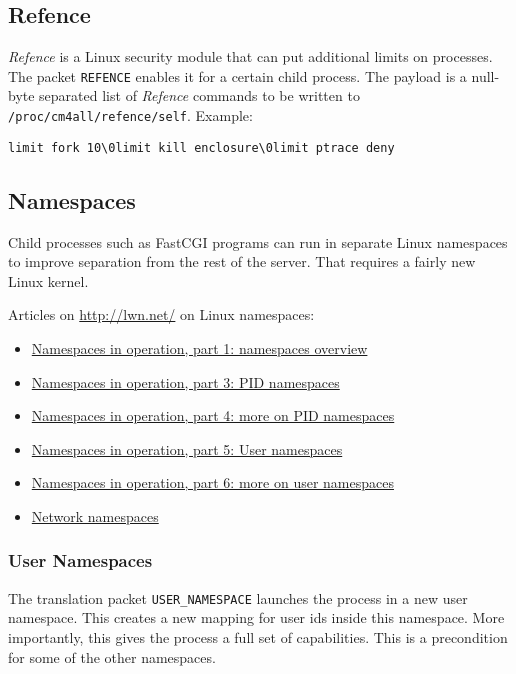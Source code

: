 \documentclass[a4paper,12pt]{article}
\begin{document}
\subsection{Refence}
\label{refence}

\emph{Refence} is a Linux security module that can put additional
limits on processes.  The packet \verb|REFENCE| enables it for a
certain child process.  The payload is a null-byte separated list of
\emph{Refence} commands to be written to
\texttt{/proc/cm4all/refence/self}.  Example:

\begin{verbatim}
limit fork 10\0limit kill enclosure\0limit ptrace deny
\end{verbatim}


\subsection{Namespaces}
\label{ns}

Child processes such as FastCGI programs can run in separate Linux
namespaces to improve separation from the rest of the server.  That
requires a fairly new Linux kernel.

Articles on \url{http://lwn.net/} on Linux namespaces:

\begin{itemize}
\item \href{https://lwn.net/Articles/531114/}{Namespaces in operation,
  part 1: namespaces overview}
\item \href{http://lwn.net/Articles/531419/}{Namespaces in operation,
  part 3: PID namespaces}
\item \href{http://lwn.net/Articles/532748/}{Namespaces in operation,
  part 4: more on PID namespaces}
\item \href{http://lwn.net/Articles/532593/}{Namespaces in operation,
  part 5: User namespaces}
\item \href{https://lwn.net/Articles/540087/}{Namespaces in operation,
  part 6: more on user namespaces}
\item \href{http://lwn.net/Articles/219794/}{Network namespaces}
\end{itemize}

\subsubsection{User Namespaces}

The translation packet \verb|USER_NAMESPACE| launches the process in a
new user namespace.  This creates a new mapping for user ids inside
this namespace.  More importantly, this gives the process a full set
of capabilities.  This is a precondition for some of the other
namespaces.
\end{document}
